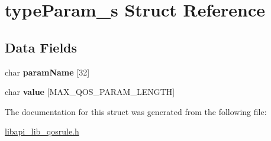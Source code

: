 \hypertarget{structtypeParam__s}{}\section{type\+Param\+\_\+s Struct Reference}
\label{structtypeParam__s}
\subsection*{Data Fields}
\begin{DoxyCompactItemize}
\item 
\mbox{\label{structtypeParam__s_aca34a90f7b381fbf750a847d9747c7b5}} 
char {\bfseries param\+Name} \mbox{[}32\mbox{]}
\item 
\mbox{\label{structtypeParam__s_a2617047b7a87beb5c0530f0fdfaae498}} 
char {\bfseries value} \mbox{[}M\+A\+X\+\_\+\+Q\+O\+S\+\_\+\+P\+A\+R\+A\+M\+\_\+\+L\+E\+N\+G\+TH\mbox{]}
\end{DoxyCompactItemize}


The documentation for this struct was generated from the following file\+:\begin{DoxyCompactItemize}
\item 
\hyperlink{libapi__lib__qosrule_8h}{libapi\+\_\+lib\+\_\+qosrule.\+h}\end{DoxyCompactItemize}
